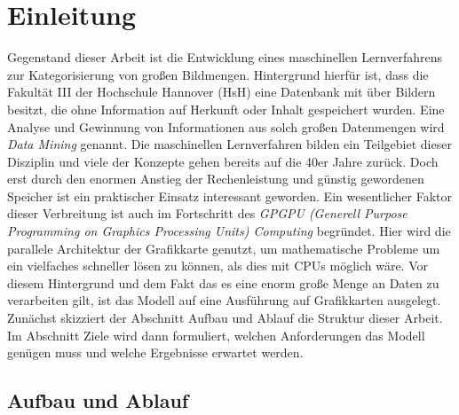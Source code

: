 \chapter{Einleitung}

Gegenstand dieser Arbeit ist die Entwicklung eines maschinellen Lernverfahrens zur Kategorisierung von großen Bildmengen. Hintergrund hierfür ist, dass die Fakultät III der Hochschule Hannover (HsH) eine Datenbank mit über  Bildern besitzt, die ohne Information auf Herkunft oder Inhalt gespeichert wurden. Eine Analyse und Gewinnung von Informationen aus solch großen Datenmengen wird \textit{Data Mining} genannt. Die maschinellen Lernverfahren bilden ein Teilgebiet dieser Disziplin und viele der Konzepte gehen bereits auf die 40er Jahre zurück. Doch erst durch den enormen Anstieg der Rechenleistung und günstig gewordenen Speicher ist ein praktischer Einsatz interessant geworden. 
Ein wesentlicher Faktor dieser Verbreitung ist auch im Fortschritt des \textit{GPGPU (Generell Purpose Programming on Graphics Processing Units) Computing} begründet. Hier wird die parallele Architektur der Grafikkarte genutzt, um mathematische Probleme um ein vielfaches schneller lösen zu können, als dies mit CPUs möglich wäre. Vor diesem Hintergrund und dem Fakt das es eine enorm große Menge an Daten zu verarbeiten gilt, ist das Modell auf eine Ausführung auf Grafikkarten ausgelegt. \newline
Zunächst skizziert der Abschnitt Aufbau und Ablauf die Struktur dieser Arbeit. Im Abschnitt Ziele wird dann formuliert, welchen Anforderungen das Modell genügen muss und welche Ergebnisse erwartet werden.

\section{Aufbau und Ablauf}

